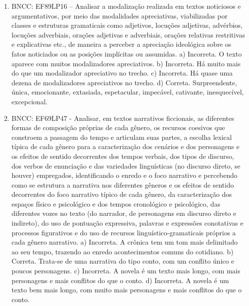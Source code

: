 \begin{enumerate}
\item
BNCC: EF89LP16 -- Analisar a modalização realizada em textos noticiosos
e argumentativos, por meio das modalidades apreciativas, viabilizadas
por classes e estruturas gramaticais como adjetivos, locuções adjetivas,
advérbios, locuções adverbiais, orações adjetivas e adverbiais, orações
relativas restritivas e explicativas etc., de maneira a perceber a
apreciação ideológica sobre os fatos noticiados ou as posições
implícitas ou assumidas.
a) Incorreta. O texto aparece com muitos modalizadores apreciativos. b)
Incorreta. Há muito mais do que um modalizador apreciativo no trecho. c)
Incorreta. Há quase uma dezena de modalizadores apreciativos no trecho.
d) Correta. Surpreendente, única, emocionante, extasiada, espetacular,
impecável, cativante, inesquecível, excepcional.

\item
BNCC: EF69LP47 - Analisar, em textos narrativos ficcionais, as
diferentes formas de composição próprias de cada gênero, os recursos
coesivos que constroem a passagem do tempo e articulam suas partes, a
escolha lexical típica de cada gênero para a caracterização dos cenários
e dos personagens e os efeitos de sentido decorrentes dos tempos
verbais, dos tipos de discurso, dos verbos de enunciação e das
variedades linguísticas (no discurso direto, se houver) empregados,
identificando o enredo e o foco narrativo e percebendo como se estrutura
a narrativa nos diferentes gêneros e os efeitos de sentido decorrentes
do foco narrativo típico de cada gênero, da caracterização dos espaços
físico e psicológico e dos tempos cronológico e psicológico, das
diferentes vozes no texto (do narrador, de personagens em discurso
direto e indireto), do uso de pontuação expressiva, palavras e
expressões conotativas e processos figurativos e do uso de recursos
linguístico-gramaticais próprios a cada gênero narrativo.
a) Incorreta. A crônica tem um tom mais delimitado ao seu tempo,
trazendo ao enredo acontecimentos comuns do cotidiano. b) Correta.
Trata-se de uma narrativa do tipo conto, com um conflito único e poucos
personagens. c) Incorreta. A novela é um texto mais longo, com mais
personagens e mais conflitos do que o conto. d) Incorreta. A novela é um
texto bem mais longo, com muito mais personagens e mais conflitos do que
o conto.


\end{enumerate}
